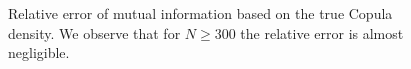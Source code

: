 \documentclass[../Thesis.tex]{subfiles}
\begin{document}
\begin{figure}[H]
\begin{subfigure}[t]{0.49\textwidth}
        \caption{}
        \label{subfig:new MI method all zoom}
    \end{subfigure}
    \caption{Relative error of mutual information based on the true Copula density. We observe that for $N\geq 300$ the relative error is almost negligible.}
    \label{fig:approximation of mutual information knowing the true distribution}
\end{figure}










\end{document}
